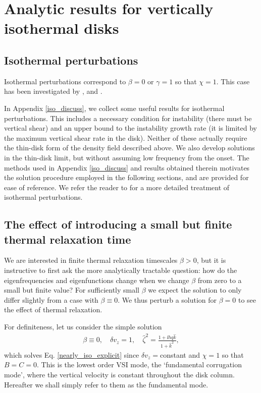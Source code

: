 \section{Analytic results for vertically isothermal disks}\label{analytical}  

\subsection{Isothermal perturbations}\label{iso_pert}
Isothermal perturbations correspond to $\beta = 0$ or $\gamma=1$ so 
that $\chi = 1$. This case has been investigated by ,
 and .  

In Appendix \ref{iso_discuss}, we collect some useful results for
isothermal  perturbations. This includes a necessary condition for
instability (there must be vertical shear) and an upper bound to the
instability growth rate (it is limited by the maximum vertical shear
rate in the disk). Neither of these actually require the thin-disk
form of the density field described above.  
We also develop solutions in the thin-disk
limit, but without assuming low frequency from the onset. 
The methods used in Appendix \ref{iso_discuss} and results obtained
therein motivates the solution procedure employed in the following
sections, and are provided for ease of reference. We refer the reader
to  for a more detailed treatment of isothermal 
perturbations. %

\subsection{The effect of introducing a small but finite
  thermal relaxation time}\label{relax_pert}
We are interested in finite thermal relaxation
timescales $\beta > 0$, but it is instructive to
first ask  the more analytically tractable question: how 
do the eigenfrequencies and eigenfunctions change when we change
$\beta$ from zero to a small but finite value? For 
sufficiently small $\beta$ we expect the solution to only differ
slightly from a case with $\beta\equiv 0$. We thus perturb a solution
for $\beta=0$ to see the effect of thermal relaxation.  

For definiteness, let us consider the simple solution 
\begin{align}
  \beta\equiv 0, \quad \delta v_z = 1,\quad \hat{\zeta}^2 = \frac{1 +
  \ii h q \hat{k}}{1+\hat{k}^2}, \label{pert_basic} 
\end{align}
which solves Eq. \ref{nearly_iso_explicit} since $\delta
v_z=$constant and $\chi=1$ so that $B=C=0$. 
This is the lowest order VSI mode, the `fundamental corrugation mode',
where the vertical velocity is constant throughout the disk
column. Hereafter we shall simply refer to them as the fundamental
mode. 

